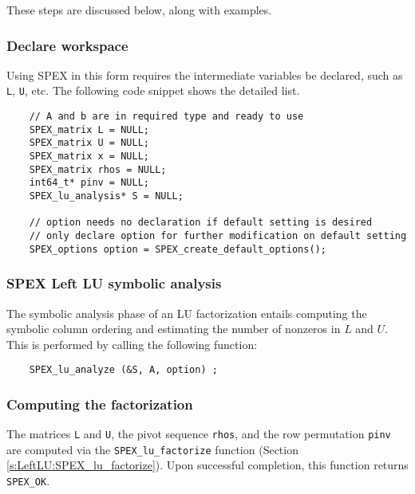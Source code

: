 \documentclass[12pt]{report}
\theoremstyle{definition}
\begin{document}
\noindent These steps are discussed below, along with examples.

\subsubsection{Declare workspace}

Using SPEX in this form requires the intermediate variables be declared, such as \verb|L|, \verb|U|, etc. The following code snippet shows the detailed list.

{\small
\begin{verbatim}
    // A and b are in required type and ready to use
    SPEX_matrix L = NULL;
    SPEX_matrix U = NULL;
    SPEX_matrix x = NULL;
    SPEX_matrix rhos = NULL;
    int64_t* pinv = NULL;
    SPEX_lu_analysis* S = NULL;

    // option needs no declaration if default setting is desired
    // only declare option for further modification on default setting
    SPEX_options option = SPEX_create_default_options();
     \end{verbatim} }

\subsubsection{SPEX Left LU symbolic analysis}

The symbolic analysis phase of an LU factorization entails computing the symbolic column ordering and estimating the number of nonzeros in $L$ and $U$. This is performed by calling the following function:

{\small
    \begin{verbatim}
    SPEX_lu_analyze (&S, A, option) ; \end{verbatim} }


\subsubsection{Computing the factorization}

The matrices \verb|L| and \verb|U|, the pivot sequence \verb|rhos|, and the row
permutation \verb|pinv| are computed via the \verb|SPEX_lu_factorize| function
(Section \ref{s:LeftLU:SPEX_lu_factorize}).  Upon successful completion, this
function returns \verb|SPEX_OK|.
\end{document}
